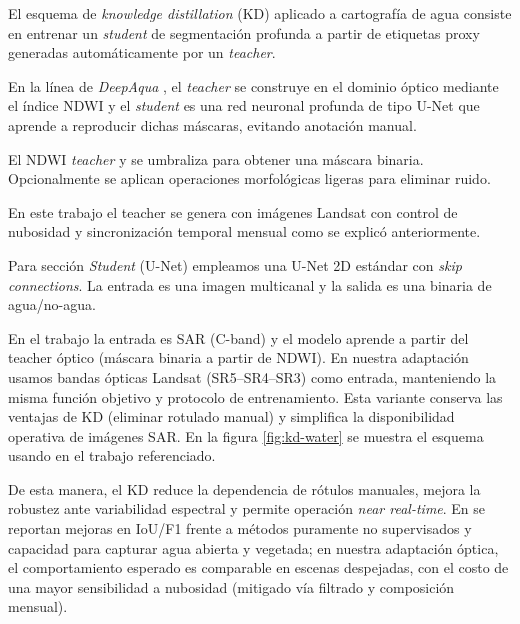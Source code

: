 El esquema de \textit{knowledge distillation} (KD) aplicado a cartografía de agua consiste en entrenar un \textit{student} de segmentación profunda a partir de etiquetas proxy generadas automáticamente por un \textit{teacher}. 

En la línea de \emph{DeepAqua} \cite{DeepAqua2023}, el \textit{teacher} se construye en el dominio óptico mediante el índice NDWI y el \textit{student} es una red neuronal profunda de tipo U-Net que aprende a reproducir dichas máscaras, evitando anotación manual.

El NDWI \textit{teacher} y se umbraliza para obtener una máscara binaria. Opcionalmente se aplican operaciones morfológicas ligeras para eliminar ruido. 

En este trabajo el teacher se genera con imágenes Landsat con control de nubosidad y sincronización temporal mensual como se explicó anteriormente.

Para sección \textit{Student} (U-Net) empleamos una U-Net 2D estándar con \emph{skip connections}. La entrada es una imagen multicanal y la salida es una binaria de agua/no-agua. 

En el trabajo \cite{DeepAqua2023} la entrada es SAR (C-band) y el modelo aprende a partir del teacher óptico (máscara binaria a partir de NDWI). En nuestra adaptación usamos bandas ópticas Landsat (SR5--SR4--SR3) como entrada, manteniendo la misma función objetivo y protocolo de entrenamiento. Esta variante conserva las ventajas de KD (eliminar rotulado manual) y simplifica la disponibilidad operativa de imágenes SAR. En la figura \ref{fig:kd-water} se muestra el esquema usando en el trabajo referenciado. 

De esta manera, el KD reduce la dependencia de rótulos manuales, mejora la robustez ante variabilidad espectral y permite operación \emph{near real-time}. En \cite{DeepAqua2023} se reportan mejoras en IoU/F1 frente a métodos puramente no supervisados y capacidad para capturar agua abierta y vegetada; en nuestra adaptación óptica, el comportamiento esperado es comparable en escenas despejadas, con el costo de una mayor sensibilidad a nubosidad (mitigado vía filtrado y composición mensual).

